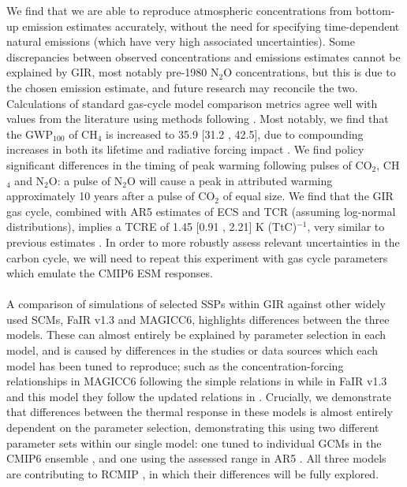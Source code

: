 \documentclass[gmd, manuscript]{copernicus}
\begin{document}
We find that we are able to reproduce atmospheric concentrations from bottom-up emission estimates accurately, without the need for specifying time-dependent natural emissions (which have very high associated uncertainties). Some discrepancies between observed concentrations and emissions estimates cannot be explained by GIR, most notably pre-1980 N$_2$O concentrations, but this is due to the chosen emission estimate, and future research may reconcile the two. Calculations of standard gas-cycle model comparison metrics agree well with values from the literature using methods following \cite{Joos2013}. Most notably, we find that the GWP$_{100}$ of CH$_4$ is increased to 35.9 [31.2 , 42.5], due to compounding increases in both its lifetime and radiative forcing impact \citep{Etminan2016,Holmes2013}. We find policy significant differences in the timing of peak warming following pulses of CO$_2$, CH$_4$ and N$_2$O: a pulse of N$_2$O will cause a peak in attributed warming approximately 10 years after a pulse of CO$_2$ of equal size. We find that the GIR gas cycle, combined with AR5 estimates of ECS and TCR \citep{Myhre2013a} (assuming log-normal distributions), implies a TCRE of 1.45 [0.91 , 2.21] K (TtC)$^{-1}$, very similar to previous estimates \citep{Millar20160449}. In order to more robustly assess relevant uncertainties in the carbon cycle, we will need to repeat this experiment with gas cycle parameters which emulate the CMIP6 ESM responses.\\\\
A comparison of simulations of selected SSPs within GIR against other widely used SCMs, FaIR v1.3 and MAGICC6, highlights differences between the three models. These can almost entirely be explained by parameter selection in each model, and is caused by differences in the studies or data sources which each model has been tuned to reproduce; such as the concentration-forcing relationships in MAGICC6 following the simple relations in \cite{Myhre2013a} while in FaIR v1.3 and this model they follow the updated relations in \cite{Etminan2016}. Crucially, we demonstrate that differences between the thermal response in these models is almost entirely dependent on the parameter selection, demonstrating this using two different parameter sets within our single model: one tuned to individual GCMs in the CMIP6 ensemble \citep{Tsutsui2017}, and one using the assessed range in AR5 \citep{Collins2013}. All three models are contributing to RCMIP \cite{Nicholls2019}, in which their differences will be fully explored.\\\\
\end{document}
